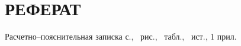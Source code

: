 \part*{РЕФЕРАТ}

Расчетно--пояснительная записка \pageref{LastPage} с., \totalfigures\ рис., \totaltables\ табл., \thetotalbibentries\ ист., 1 прил.

%
%
%
